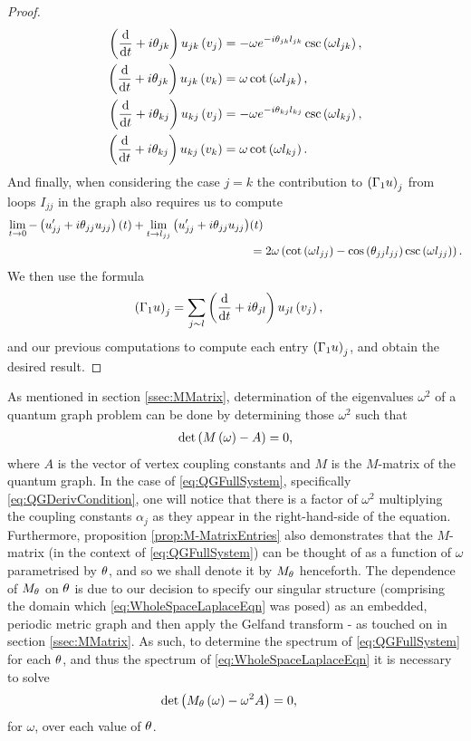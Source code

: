 \begin{proof}
	\begin{align*}
		\left( \dfrac{\mathrm{d}}{\mathrm{d}t}+i\theta_{jk} \right)u_{jk}\left( v_j \right) &= -\omega e^{-i\theta_{jk}l_{jk}}\csc\left( \omega l_{jk} \right), \\
		\left( \dfrac{\mathrm{d}}{\mathrm{d}t}+i\theta_{jk} \right)u_{jk}\left( v_k \right) &= \omega\cot\left( \omega l_{jk} \right), \\
		\left( \dfrac{\mathrm{d}}{\mathrm{d}t}+i\theta_{kj} \right)u_{kj}\left( v_j \right) &= -\omega e^{-i\theta_{kj}l_{kj}}\csc\left( \omega l_{kj} \right), \\
		\left( \dfrac{\mathrm{d}}{\mathrm{d}t}+i\theta_{kj} \right)u_{kj}\left( v_k \right) &= \omega\cot\left( \omega l_{kj} \right).
	\end{align*}
	And finally, when considering the case $j=k$ the contribution to $\left( \Gamma_1 u \right)_j$ from loops $I_{jj}$ in the graph also requires us to compute
	\begin{align*}
		\lim_{t\rightarrow0}-\left( u_{jj}'+i\theta_{jj}u_{jj} \right)(t) + \lim_{t\rightarrow l_{jj}}\left( u_{jj}'+i\theta_{jj}u_{jj} \right) & (t) \\
		&= 2\omega\left(  \cot\left( \omega l_{jj} \right) - \cos\left( \theta_{jj}l_{jj} \right)\csc\left( \omega l_{jj} \right) \right).	
	\end{align*}
	We then use the formula
	\begin{align*}
		\left( \Gamma_1 u \right)_j &= \sum_{j\sim l} \left( \dfrac{\mathrm{d}}{\mathrm{d}t}+i\theta_{jl} \right)u_{jl}\left( v_j \right),
	\end{align*}
	and our previous computations to compute each entry $\left( \Gamma_1 u \right)_j$, and obtain the desired result.
\end{proof}

As mentioned in section \ref{ssec:MMatrix}, determination of the eigenvalues $\omega^2$ of a quantum graph problem can be done by determining those $\omega^2$ such that
\begin{align*}
	\det\left(  M\left( \omega \right) - A  \right) = 0,
\end{align*}
where $A$ is the vector of vertex coupling constants and $M$ is the $M$-matrix of the quantum graph.
In the case of \eqref{eq:QGFullSystem}, specifically \eqref{eq:QGDerivCondition}, one will notice that there is a factor of $\omega^2$ multiplying the coupling constants $\alpha_j$ as they appear in the right-hand-side of the equation.
Furthermore, proposition \ref{prop:M-MatrixEntries} also demonstrates that the $M$-matrix (in the context of \eqref{eq:QGFullSystem}) can be thought of as a function of $\omega$ parametrised by $\theta$, and so we shall denote it by $M_{\theta}$ henceforth.
The dependence of $M_\theta$ on $\theta$ is due to our decision to specify our singular structure (comprising the domain which \eqref{eq:WholeSpaceLaplaceEqn} was posed) as an embedded, periodic metric graph and then apply the Gelfand transform - as touched on in section \ref{ssec:MMatrix}.
As such, to determine the spectrum of \eqref{eq:QGFullSystem} for each $\theta$, and thus the spectrum of \eqref{eq:WholeSpaceLaplaceEqn} it is necessary to solve
\begin{align} \label{eq:QGDetSolveCondition}
	\det\left( M_\theta\left( \omega \right) - \omega^2 A \right) &= 0,
\end{align}
for $\omega$, over each value of $\theta$.

